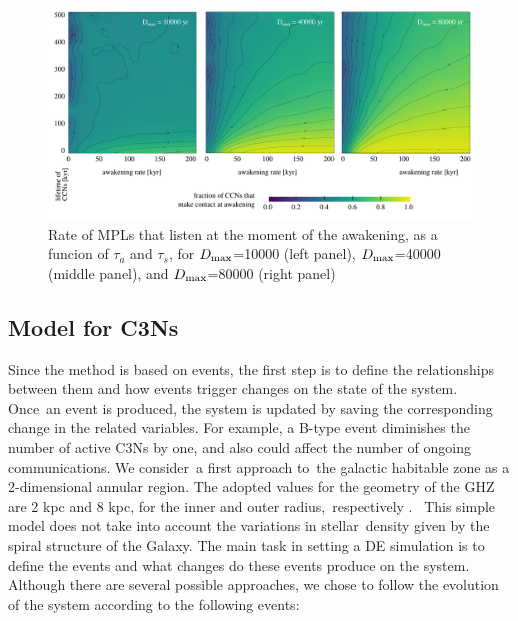 \documentclass[crop]{CSLB}
\newcommand{\cetis}{C3Ns}
\begin{document}
\begin{figure} %
   \centering
   \includegraphics[width=\textwidth]{F_C_at_A.pdf}
   \caption{
Rate of MPLs that listen at the moment of the
awakening, as a funcion of $\tau_a$ and $\tau_s$, for
$D_{\rm max}$=10000 (left panel),
$D_{\rm max}$=40000 (middle panel), and
$D_{\rm max}$=80000 (right panel)
%
   }
   \label{F_C_at_A}
\end{figure}
        

                     

\subsection{Model for \cetis{}}

Since the method is based on events, the first step is to define the relationships between them and how events trigger changes on the state of the system.
%
Once an event is produced, the system is updated by saving the corresponding change in the related variables.
%
For example, a B-type event diminishes the number of active \cetis{} by one, and also could affect the number of ongoing communications.
%
We consider a first approach to the galactic habitable zone as a 2-dimensional annular region.
%
The adopted values for the geometry of the GHZ are 2 kpc and 8 kpc, for the inner and outer radius, respectively \citep{lineweaver_galactic_2004}. 
%
This simple model does not take into account the variations in stellar density given by the spiral structure of the Galaxy.
%
The main task in setting a DE simulation is to define the events and what changes do these events produce on the system.
%
Although there are several possible approaches, we chose to follow the evolution of the system according to the following events:
\end{document}
